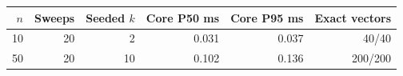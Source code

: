 \begin{tabular}{@{}rrrrrr@{}}
\toprule
$n$ & Sweeps & Seeded $k$ & Core P50 ms & Core P95 ms & Exact vectors \\
\midrule
10 & 20 & 2 & 0.031 & 0.037 & 40/40 \\
50 & 20 & 10 & 0.102 & 0.136 & 200/200 \\
\bottomrule
\end{tabular}
